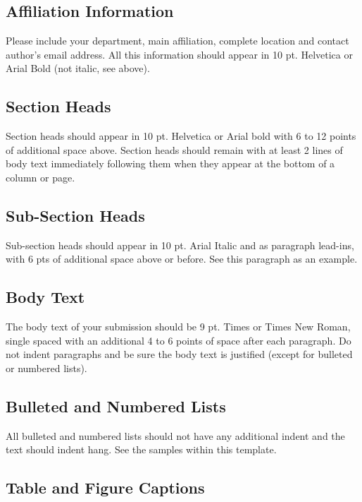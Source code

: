 \documentclass[9pt]{extarticle}
\begin{document}
\begin{multicols}{2}
\subsection{Affiliation Information}

Please include your department, main affiliation, complete location and contact author’s email address.
All this information should appear in 10 pt. Helvetica or Arial Bold (not italic, see above).

\subsection{Section Heads}

Section heads should appear in 10 pt. Helvetica or Arial bold with 6 to 12 points of additional space above.
Section heads should remain with at least 2 lines of body text immediately following them when they appear at the bottom of a column or page.

\subsection{Sub-Section Heads}

Sub-section heads should appear in 10 pt. Arial Italic and as paragraph lead-ins, with 6 pts of additional space above or before.
See this paragraph as an example.

\subsection{Body Text}

The body text of your submission should be 9 pt. Times or Times New Roman, single spaced with an additional 4 to 6 points of space after each paragraph. Do not indent paragraphs and be sure the body text is justified (except for bulleted or numbered lists).

\subsection{Bulleted and Numbered Lists}

All bulleted and numbered lists should not have any additional indent and the text should indent hang.
See the samples within this template.

\subsection{Table and Figure Captions}


\end{multicols}
\end{document}
